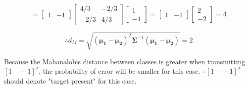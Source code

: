 \documentclass[fleqn]{article}
\begin{document}
\begin{enumerate}
\begin{enumerate}
			\begin{equation*}
				= \begin{bmatrix} 1 & -1 \end{bmatrix}\begin{bmatrix} 4/3 & -2/3 \\ -2/3 & 4/3 \end{bmatrix}\begin{bmatrix} 1 \\ -1 \end{bmatrix} = \begin{bmatrix} 1 & -1 \end{bmatrix}\begin{bmatrix} 2 \\ -2 \end{bmatrix} = 4
			\end{equation*}
			
			\begin{equation*}
				\therefore d_M = \sqrt{(\mathbf{\mu_1} - \mathbf{\mu_2})^T\mathbf{\Sigma}^{-1}(\mathbf{\mu_1} - \mathbf{\mu_2})} = 2
			\end{equation*}
			
			Because the Mahanalobis distance between classes is greater when transmitting $[1 \quad -1]^T$, the probability of error will be smaller for this case. $\therefore [1 \quad -1]^T$ should denote "target present" for this case.
			
		\end{enumerate}
	\end{enumerate}
\end{document}
